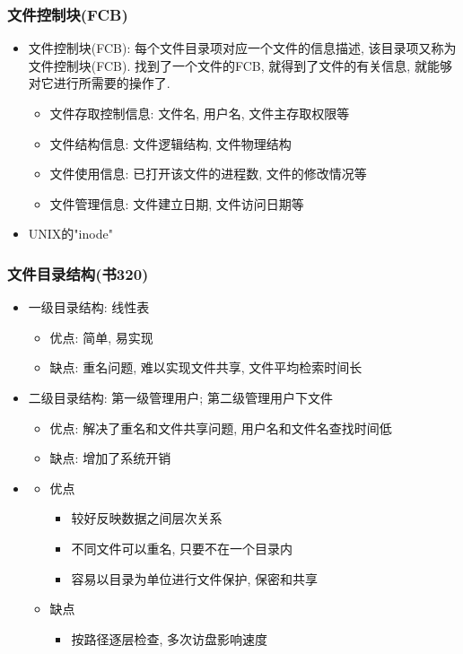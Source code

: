 \documentclass[a4paper, UTF8]{article}
\begin{document}
\subsubsection{文件控制块(FCB)}
\begin{itemize}
\item 文件控制块(FCB): 每个文件目录项对应一个文件的信息描述, 该目录项又称为文件控制块(FCB). 找到了一个文件的FCB, 就得到了文件的有关信息, 就能够对它进行所需要的操作了.
	\begin{itemize}
	\item 文件存取控制信息: 文件名, 用户名, 文件主存取权限等
	\item 文件结构信息: 文件逻辑结构, 文件物理结构
	\item 文件使用信息: 已打开该文件的进程数, 文件的修改情况等
	\item 文件管理信息: 文件建立日期, 文件访问日期等
	\end{itemize}
\item UNIX的"inode"
\end{itemize}
\subsubsection{文件目录结构(书320)}
\begin{itemize}
\item 一级目录结构: 线性表
	\begin{itemize}
	\item 优点: 简单, 易实现
	\item 缺点: 重名问题, 难以实现文件共享, 文件平均检索时间长
	\end{itemize}
\item 二级目录结构: 第一级管理用户; 第二级管理用户下文件
	\begin{itemize}
	\item 优点: 解决了重名和文件共享问题, 用户名和文件名查找时间低
	\item 缺点: 增加了系统开销
	\end{itemize}
\item 
	\begin{itemize}
	\item 优点
		\begin{itemize}
		\item 较好反映数据之间层次关系
		\item 不同文件可以重名, 只要不在一个目录内
		\item 容易以目录为单位进行文件保护, 保密和共享
		\end{itemize}
	\item 缺点
		\begin{itemize}
		\item 按路径逐层检查, 多次访盘影响速度
		\end{itemize}
	\end{itemize}
\end{itemize}
\end{document}
